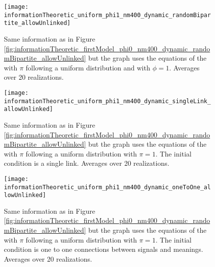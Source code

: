 \begin{figure}
  \centering
  \texttt{[image: informationTheoretic\_uniform\_phi1\_nm400\_dynamic\_randomBipartite\_allowUnlinked]}
  \caption{Same information as in Figure \ref{fig:informationTheoretic_firstModel_phi0_nm400_dynamic_randomBipartite_allowUnlinked} but the graph uses the equations of the \secondmodel{} with $\pi$ following a uniform distribution and with $\phi=1$. Averages over 20 realizations.}
  \label{fig:informationTheoretic_uniform_phi1_nm400_dynamic_randomBipartite_allowUnlinked}
\end{figure}

\begin{figure}
  \centering
  \texttt{[image: informationTheoretic\_uniform\_phi1\_nm400\_dynamic\_singleLink\_allowUnlinked]}
  \caption{Same information as in Figure \ref{fig:informationTheoretic_firstModel_phi0_nm400_dynamic_randomBipartite_allowUnlinked} but the graph uses the equations of the \secondmodel{} with $\pi$ following a uniform distribution with $\pi=1$.
The initial condition is a single link. Averages over 20 realizations.}
  \label{fig:informationTheoretic_uniform_phi1_nm400_dynamic_singleLink_allowUnlinked}
\end{figure}

\begin{figure}
  \centering
  \texttt{[image: informationTheoretic\_uniform\_phi1\_nm400\_dynamic\_oneToOne\_allowUnlinked]}
  \caption{Same information as in Figure \ref{fig:informationTheoretic_firstModel_phi0_nm400_dynamic_randomBipartite_allowUnlinked} but the graph uses the equations of the \secondmodel{} with $\pi$ following a uniform distribution with $\pi=1$.
The initial condition is one to one connections between signals and meanings. Averages over 20 realizations.}
  \label{fig:informationTheoretic_uniform_phi1_nm400_dynamic_oneToOne_allowUnlinked}
\end{figure}


